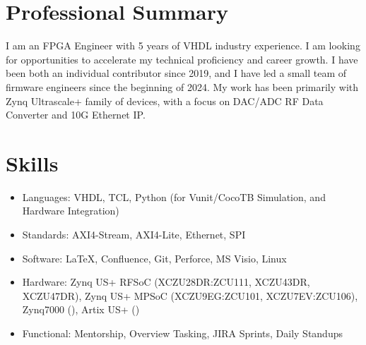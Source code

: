 \documentclass[10pt,final,sans]{resume}
\begin{document}
\setlength\headheight{28pt} %

\section{Professional Summary}
\raggedright{I am an FPGA Engineer with 5 years of VHDL industry experience. I am looking for opportunities to accelerate my technical proficiency and career growth. I have been both an individual contributor since 2019, and I have led a small team of firmware engineers since the beginning of 2024. My work has been primarily with Zynq Ultrascale+ family of devices, with a focus on DAC/ADC RF Data Converter and 10G Ethernet IP.}

\section{Skills}
\begin{itemize}
  \item Languages: VHDL, TCL, Python (for Vunit/CocoTB Simulation, and Hardware Integration)
  \item Standards: AXI4-Stream, AXI4-Lite, Ethernet, SPI
  \item Software: {\textrm \LaTeX}, Confluence, Git, Perforce, MS Visio, Linux
  \item Hardware: Zynq US+ RFSoC (XCZU28DR:ZCU111, XCZU43DR, XCZU47DR), Zynq US+ MPSoC (XCZU9EG:ZCU101, XCZU7EV:ZCU106), Zynq7000 (), Artix US+ ()
  \item Functional: Mentorship, Overview Tasking, JIRA Sprints, Daily Standups
\end{itemize}
\end{document}
